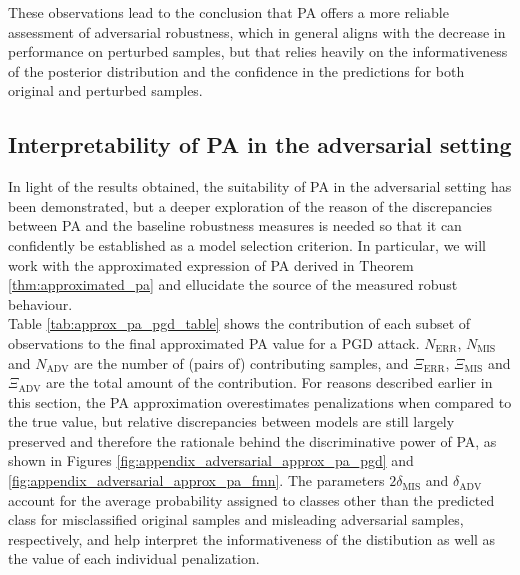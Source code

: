 These observations lead to the conclusion that PA offers a more reliable
assessment of adversarial robustness, which in general aligns with the decrease
in performance on perturbed samples, but that relies heavily on the informativeness
of the posterior distribution and the confidence in the predictions for both
original and perturbed samples. \\

\subsection{Interpretability of PA in the adversarial setting}

In light of the results obtained, the suitability of
PA in the adversarial setting has been demonstrated, but a deeper exploration of the
reason of the discrepancies between PA and the baseline robustness measures is needed
so that it can confidently be established as a model selection criterion. In particular,
we will work with the approximated expression of PA derived in Theorem \ref{thm:approximated_pa} 
and ellucidate the source of the measured robust behaviour. \\

Table \ref{tab:approx_pa_pgd_table} shows the contribution of each subset of observations to the final
approximated PA value for a PGD attack. $N_{\text{ERR}}$, $N_{\text{MIS}}$ and $N_{\text{ADV}}$ are the number of (pairs of)
contributing samples, and $\Xi_{\text{ERR}}$, $\Xi_{\text{MIS}}$ and $\Xi_{\text{ADV}}$ are
the total amount of the contribution. For reasons described earlier in this section,
the PA approximation overestimates penalizations when compared to the true value, but
relative discrepancies between models are still largely preserved and therefore the rationale
behind the discriminative power of PA, as shown in Figures \ref{fig:appendix_adversarial_approx_pa_pgd}
and \ref{fig:appendix_adversarial_approx_pa_fmn}. The parameters $2 \delta_{\text{MIS}}$ and
$\delta_{\text{ADV}}$ account for the average probability assigned to classes other than the predicted
class for misclassified original samples and misleading adversarial samples, respectively, and 
help interpret the informativeness of the distibution as well as the value of each individual 
penalization. \\

